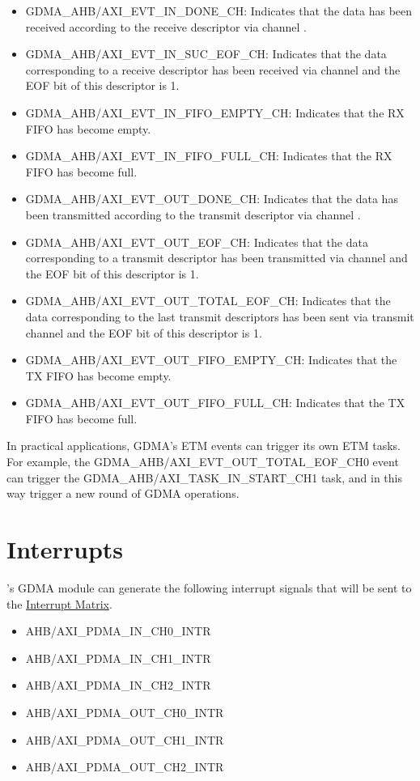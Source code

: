\documentclass[main\_\_EN.tex]{subfiles}
\begin{document}
\begin{itemize}
    \item GDMA\_AHB/AXI\_EVT\_IN\_DONE\_CH: Indicates that the data has been received according to the receive descriptor via channel .
    \item GDMA\_AHB/AXI\_EVT\_IN\_SUC\_EOF\_CH: Indicates that the data corresponding to a receive descriptor has been received via channel  and the EOF bit of this descriptor is 1.
    \item GDMA\_AHB/AXI\_EVT\_IN\_FIFO\_EMPTY\_CH: Indicates that the RX FIFO has become empty.
    \item GDMA\_AHB/AXI\_EVT\_IN\_FIFO\_FULL\_CH: Indicates that the RX FIFO has become full.
    \item GDMA\_AHB/AXI\_EVT\_OUT\_DONE\_CH: Indicates that the data has been transmitted according to the transmit descriptor via channel .
    \item GDMA\_AHB/AXI\_EVT\_OUT\_EOF\_CH: Indicates that the data corresponding to a transmit descriptor has been transmitted via channel  and the EOF bit of this descriptor is 1.
    \item GDMA\_AHB/AXI\_EVT\_OUT\_TOTAL\_EOF\_CH: Indicates that the data corresponding to the last transmit descriptors has been sent via transmit channel  and the EOF bit of this descriptor is 1.
    \item GDMA\_AHB/AXI\_EVT\_OUT\_FIFO\_EMPTY\_CH: Indicates that the TX FIFO has become empty.
    \item GDMA\_AHB/AXI\_EVT\_OUT\_FIFO\_FULL\_CH: Indicates that the TX FIFO has become full.
\end{itemize}

In practical applications, GDMA's ETM events can trigger its own ETM tasks. For example, the GDMA\_AHB/AXI\_EVT\_OUT\_TOTAL\_EOF\_CH0 event can trigger the GDMA\_AHB/AXI\_TASK\_IN\_START\_CH1 task, and in this way trigger a new round of GDMA operations.

\section{Interrupts}

\chipname{}'s GDMA module can generate the following interrupt signals that will be sent to the \hyperref[mod:intmtrx]{Interrupt Matrix}.

    \begin{itemize}
        \item AHB/AXI\_PDMA\_IN\_CH0\_INTR
        \item AHB/AXI\_PDMA\_IN\_CH1\_INTR
        \item AHB/AXI\_PDMA\_IN\_CH2\_INTR
        \item AHB/AXI\_PDMA\_OUT\_CH0\_INTR
        \item AHB/AXI\_PDMA\_OUT\_CH1\_INTR
        \item AHB/AXI\_PDMA\_OUT\_CH2\_INTR
    \end{itemize}
\end{document}
